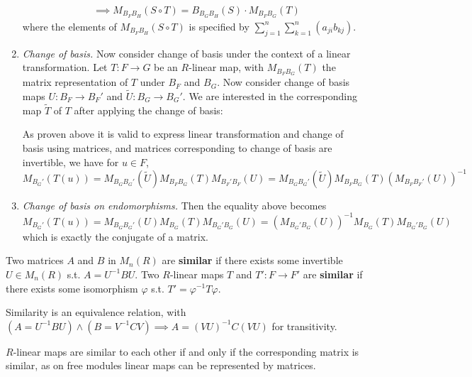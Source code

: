 \begin{remark}
\begin{enumerate}
\begin{align*}
            & \implies M_{B_F B_H} (S\circ T) = B_{B_G B_H}(S) \cdot M_{B_F B_G}(T)
        \end{align*}
        where the elements of $M_{B_F B_H} (S\circ T)$ is specified by $\sum_{j=1}^{n}\sum_{k=1}^{n} (a_{ji} b_{kj})$.
        \item \emph{Change of basis.} Now consider change of basis under the context of a linear transformation. Let $T: F\to G$ be an $R$-linear map, with $M_{B_F B_G}(T)$ the matrix representation of $T$ under $B_F$ and $B_G$. Now consider change of basis maps $U: B_F\to B_F'$ and $\tilde{U}: B_G \to B_G'$. We are interested in the corresponding map $\tilde{T}$ of $T$ after applying the change of basis:
        \begin{figure}[htbp]
            \centering
        \end{figure}

        As proven above it is valid to express linear transformation and change of basis using matrices, and matrices corresponding to change of basis are invertible, we have for $u\in F$,
        \[
            M_{B_G'}(T(u)) = M_{B_G B_G'}(\tilde{U}) M_{B_F B_G}(T) M_{B_F' B_F}(U) = M_{B_G B_G'}(\tilde{U}) M_{B_F B_G}(T) (M_{B_F B_F'}(U))^{-1}
        \]
        \item \emph{Change of basis on endomorphisms.} Then the equality above becomes
        \[
            M_{B_G'}(T(u)) = M_{B_G B_G'}(U) M_{B_G}(T) M_{B_G' B_G}(U) = (M_{B_G' B_G}(U))^{-1} M_{B_G}(T) M_{B_G' B_G}(U)
        \]
        which is exactly the conjugate of a matrix. 
    \end{enumerate}
\end{remark}

\begin{definition}
    Two matrices $A$ and $B$ in $M_n(R)$ are \textbf{similar} if there exists some invertible $U\in M_n(R)$ s.t. $A = U^{-1}B U$. Two $R$-linear maps $T$ and $T': F \to F'$ are \textbf{similar} if there exists some isomorphism $\varphi$ s.t. $T' = \varphi^{-1} T \varphi$. 
\end{definition}

\begin{remark}
    Similarity is an equivalence relation, with $(A = U^{-1}BU) \wedge (B = V^{-1}CV) \implies A = (VU)^{-1}C(VU)$ for transitivity.

    $R$-linear maps are similar to each other if and only if the corresponding matrix is similar, as on free modules linear maps can be represented by matrices.
\end{remark}


